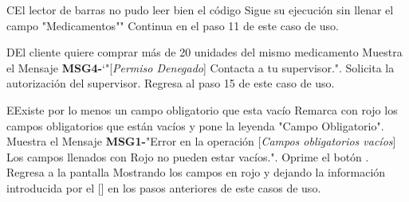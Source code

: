 		\begin{UCtrayectoriaA}{C}{El lector de barras no pudo leer bien el código}
			\UCpaso Sigue su ejecución sin llenar el campo "Medicamentos""
			\UCpaso Continua en el paso 11 de este caso de uso.	
		\end{UCtrayectoriaA}
		\begin{UCtrayectoriaA}{D}{El cliente quiere comprar más de 20 unidades del mismo medicamento}
			\UCpaso Muestra el Mensaje {\bf MSG4-}`"[{\em Permiso Denegado}] Contacta a tu supervisor.".
			\UCpaso [\UCactor] Solicita la autorización del supervisor.
			\UCpaso Regresa al paso 15 de este caso de uso.
		\end{UCtrayectoriaA}		
			\begin{UCtrayectoriaA}{E}{Existe por lo menos un campo obligatorio que esta vacío}
			\UCpaso Remarca con rojo los campos obligatorios que están vacíos y pone la leyenda "Campo Obligatorio".
			\UCpaso Muestra el Mensaje {\bf MSG1-}"Error en la operación [{\em Campos obligatorios vacíos}] Los campos llenados con Rojo no pueden estar vacíos.".
			\UCpaso[\UCactor] Oprime el botón .
			\UCpaso Regresa a la pantalla  Mostrando los campos en rojo y dejando la información introducida por el [\UCactor] en los pasos anteriores de este casos de uso.
		\end{UCtrayectoriaA}
